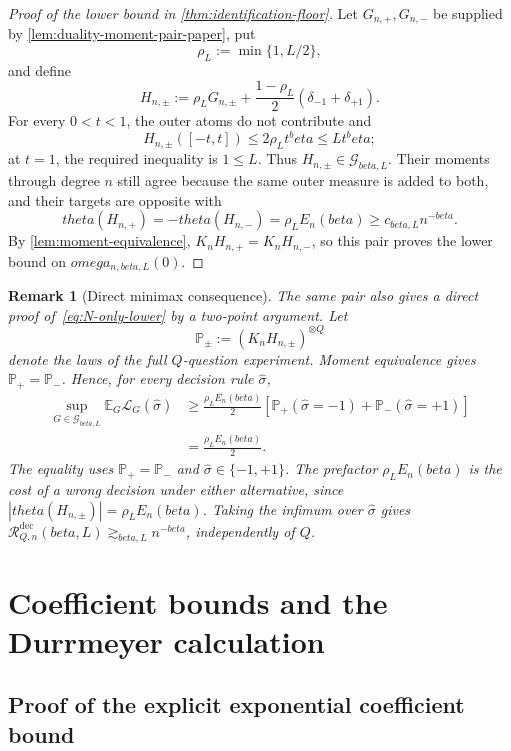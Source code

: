 \documentclass[11pt]{article}
\def\beta{beta}%
\def\theta{theta}%
\def\omega{omega}%
\newtheorem{remark}[theorem]{Remark}
\newcommand{\Pp}{\mathbb P}
\newcommand{\E}{\mathbb E}
\newcommand{\calG}{\mathcal G}
\newcommand{\calR}{\mathcal R}
\newcommand\eed[1]{{\color{green!45!black} #1}}
\begin{document}
\begin{proof}[Proof of the lower bound in \cref{thm:identification-floor}]
Let $G_{n,+},G_{n,-}$ be supplied by \cref{lem:duality-moment-pair-paper}, put
\[
\rho_L:=\min\{1,L/2\},
\]
and define
\[
H_{n,\pm}
:=
\rho_LG_{n,\pm}
+\frac{1-\rho_L}{2}(\delta_{-1}+\delta_{+1}).
\]
For every $0<t<1$, the outer atoms do not contribute and
\[
H_{n,\pm}([-t,t])
\le
2\rho_Lt^\beta
\le
Lt^\beta;
\]
at $t=1$, the required inequality is $1\le L$.  Thus $H_{n,\pm}\in\calG_{\beta,L}$.  Their moments through degree $n$ still agree because the same outer measure is added to both, and their targets are opposite with
\[
\theta(H_{n,+})
=
-\theta(H_{n,-})
=
\rho_LE_n(\beta)
\ge
c_{\beta,L}n^{-\beta}.
\]
By \cref{lem:moment-equivalence}, $K_nH_{n,+}=K_nH_{n,-}$, so this pair proves the lower bound on $\omega_{n,\beta,L}(0)$.
\end{proof}

\begin{remark}[Direct minimax consequence]
\eed{The same pair also gives a direct proof of~\eqref{eq:N-only-lower} by a two-point argument.  Let
\[
\Pp_\pm
:=
(K_nH_{n,\pm})^{\otimes Q}
\]
denote the laws of the full $Q$-question experiment.  Moment equivalence gives $\Pp_+=\Pp_-$.  Hence, for every decision rule $\widehat\sigma$,
\begin{align*}
\sup_{G\in\calG_{\beta,L}}
\E_G\mathcal L_G(\widehat\sigma)
&\ge
\frac{\rho_LE_n(\beta)}2
\left[
\Pp_+(\widehat\sigma=-1)
+
\Pp_-(\widehat\sigma=+1)
\right]\\
&=
\frac{\rho_LE_n(\beta)}2.
\end{align*}
The equality uses $\Pp_+=\Pp_-$ and $\widehat\sigma\in\{-1,+1\}$.  The prefactor $\rho_LE_n(\beta)$ is the cost of a wrong decision under either alternative, since $|\theta(H_{n,\pm})|=\rho_LE_n(\beta)$.  Taking the infimum over $\widehat\sigma$ gives $\calR^{\mathrm{dec}}_{Q,n}(\beta,L)\gtrsim_{\beta,L}n^{-\beta}$, independently of $Q$.}
\end{remark}

\section{Coefficient bounds and the Durrmeyer calculation}
\label{app:coefficients}

\subsection{Proof of the explicit exponential coefficient bound}
\end{document}
